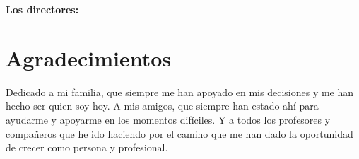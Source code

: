 
\vspace{1cm}

\textbf{Los directores:}

\vspace{5cm}




\chapter*{Agradecimientos}
\thispagestyle{empty}

       \vspace{1cm}


Dedicado a mi familia, que siempre me han apoyado en mis decisiones y me han hecho ser quien soy hoy. A mis amigos, que siempre han estado ahí para ayudarme y apoyarme en los momentos difíciles. Y a todos los profesores y compañeros que he ido haciendo por el camino que me han dado la oportunidad de crecer como persona y profesional.
